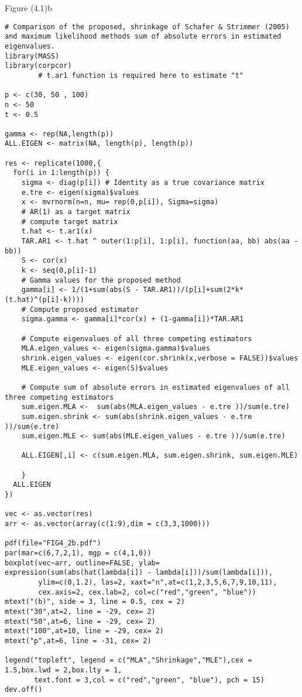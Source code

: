 Figure (4.1)b
\begin{lstlisting}
# Comparison of the proposed, shrinkage of Schafer & Strimmer (2005) and maximum likelihood methods sum of absolute errors in estimated eigenvalues.
library(MASS)
library(corpcor)
        # t.ar1 function is required here to estimate "t"

p <- c(30, 50 , 100)
n <- 50
t <- 0.5

gamma <- rep(NA,length(p))
ALL.EIGEN <- matrix(NA, length(p), length(p))

res <- replicate(1000,{
  for(i in 1:length(p)) {
    sigma <- diag(p[i]) # Identity as a true covariance matrix
    e.tre <- eigen(sigma)$values
    x <- mvrnorm(n=n, mu= rep(0,p[i]), Sigma=sigma)
    # AR(1) as a target matrix
    # compute target matrix
    t.hat <- t.ar1(x)
    TAR.AR1 <- t.hat ^ outer(1:p[i], 1:p[i], function(aa, bb) abs(aa - bb))
    S <- cor(x)
    k <- seq(0,p[i]-1)
    # Gamma values for the proposed method
    gamma[i] <- 1/(1+sum(abs(S - TAR.AR1))/(p[i]+sum(2*k*(t.hat)^(p[i]-k))))
    # Compute proposed estimator
    sigma.gamma <- gamma[i]*cor(x) + (1-gamma[i])*TAR.AR1
    
    # Compute eigenvalues of all three competing estimators
    MLA.eigen_values <- eigen(sigma.gamma)$values
    shrink.eigen_values <- eigen(cor.shrink(x,verbose = FALSE))$values
    MLE.eigen_values <- eigen(S)$values
    
    # Compute sum of absolute errors in estimated eigenvalues of all three competing estimators
    sum.eigen.MLA <-  sum(abs(MLA.eigen_values - e.tre ))/sum(e.tre)
    sum.eigen.shrink <- sum(abs(shrink.eigen_values - e.tre ))/sum(e.tre)
    sum.eigen.MLE <- sum(abs(MLE.eigen_values - e.tre ))/sum(e.tre)
    
    ALL.EIGEN[,i] <- c(sum.eigen.MLA, sum.eigen.shrink, sum.eigen.MLE)
    
    }
  ALL.EIGEN
})

vec <- as.vector(res)
arr <- as.vector(array(c(1:9),dim = c(3,3,1000)))

pdf(file="FIG4_2b.pdf")
par(mar=c(6,7,2,1), mgp = c(4,1,0))
boxplot(vec~arr, outline=FALSE, ylab= expression(sum(abs(hat(lambda[i]) - lambda[i]))/sum(lambda[i])),
        ylim=c(0,1.2), las=2, xaxt="n",at=c(1,2,3,5,6,7,9,10,11),
        cex.axis=2, cex.lab=2, col=c("red","green", "blue"))
mtext("(b)", side = 3, line = 0.5, cex = 2)
mtext("30",at=2, line = -29, cex= 2)
mtext("50",at=6, line = -29, cex= 2)
mtext("100",at=10, line = -29, cex= 2)
mtext("p",at=6, line = -31, cex= 2)

legend("topleft", legend = c("MLA","Shrinkage","MLE"),cex = 1.5,box.lwd = 2,box.lty = 1,
       text.font = 3,col = c("red","green", "blue"), pch = 15)
dev.off()
\end{lstlisting}

